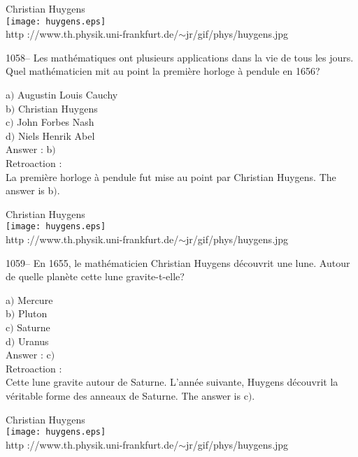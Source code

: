 ﻿\documentclass[letterpaper, 12pt]{article}
\begin{document}
        \begin{center}
        Christian Huygens\\
    \texttt{[image: huygens.eps]}\\
        {\footnotesize http
://www.th.physik.uni-frankfurt.de/$\sim$jr/gif/phys/huygens.jpg}
    \end{center}

1058-- Les math\'ematiques ont plusieurs applications dans la vie de
tous les jours. Quel math\'ematicien mit au point la premi\`ere
horloge \`a pendule en 1656?

a$)$ Augustin Louis Cauchy \\
b$)$ Christian Huygens  \\
c$)$ John Forbes Nash  \\
d$)$ Niels Henrik Abel \\

Answer : b$)$\\

Retroaction : \\
La premi\`ere horloge \`a pendule fut mise au point par Christian
Huygens.
The answer is b$)$.\\

        \begin{center}
        Christian Huygens\\
    \texttt{[image: huygens.eps]}\\
        {\footnotesize http
://www.th.physik.uni-frankfurt.de/$\sim$jr/gif/phys/huygens.jpg}
    \end{center}

1059-- En 1655, le math\'ematicien Christian Huygens d\'ecouvrit une
lune. Autour de quelle plan\`ete cette lune gravite-t-elle?

a$)$ Mercure \\
b$)$ Pluton  \\
c$)$ Saturne  \\
d$)$ Uranus \\

Answer : c$)$\\

Retroaction : \\
Cette lune gravite autour de Saturne. L'ann\'ee suivante, Huygens
d\'ecouvrit la v\'eritable forme des anneaux de Saturne.
The answer is c$)$.\\

        \begin{center}
        Christian Huygens\\
    \texttt{[image: huygens.eps]}\\
        {\footnotesize http
://www.th.physik.uni-frankfurt.de/$\sim$jr/gif/phys/huygens.jpg}
    \end{center}
\end{document}
